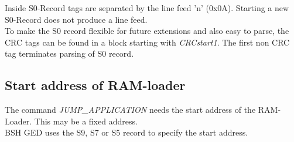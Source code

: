 \noindent{}Inside S0-Record tags are separated by the line feed '\bs{}n' (0x0A). Starting a new S0-Record does not produce a line feed.\\
To make the S0 record flexible for future extensions and also easy to parse, the CRC tags can be found in a block starting with \emph{CRCstart1}.
The first non CRC tag terminates parsing of S0 record.

\subsection{Start address of RAM-loader}
The command \emph{JUMP_APPLICATION} needs the start address of the RAM-Loader. This may be a fixed address.\\
BSH GED uses the S9, S7 or S5 record to specify the start address.
